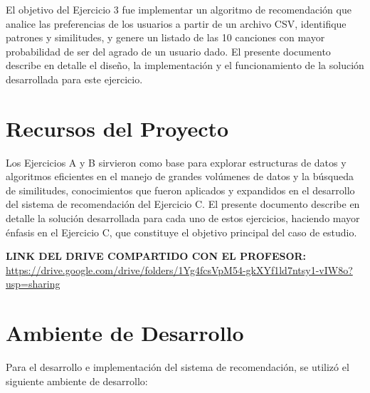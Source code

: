 \documentclass{article}
\begin{document}
El objetivo del Ejercicio 3 fue implementar un algoritmo de recomendación que analice las preferencias de los usuarios a partir de un archivo CSV, identifique patrones y similitudes, y genere un listado de las 10 canciones con mayor probabilidad de ser del agrado de un usuario dado. El presente documento describe en detalle el diseño, la implementación y el funcionamiento de la solución desarrollada para este ejercicio.

\section{Recursos del Proyecto}

Los Ejercicios A y B sirvieron como base para explorar estructuras de datos y algoritmos eficientes en el manejo de grandes volúmenes de datos y la búsqueda de similitudes, conocimientos que fueron aplicados y expandidos en el desarrollo del sistema de recomendación del Ejercicio C. El presente documento describe en detalle la solución desarrollada para cada uno de estos ejercicios, haciendo mayor énfasis en el Ejercicio C, que constituye el objetivo principal del caso de estudio.


\vspace{0.5em} %
\noindent \textbf{LINK DEL DRIVE COMPARTIDO CON EL PROFESOR:} \\
\href{https://drive.google.com/drive/folders/1Yg4fcsVpM54-gkXYf1ld7ntsy1-vIW8o?usp=sharing}{https://drive.google.com/drive/folders/1Yg4fcsVpM54-gkXYf1ld7ntsy1-vIW8o?usp=sharing}

\section{Ambiente de Desarrollo}

Para el desarrollo e implementación del sistema de recomendación, se utilizó el siguiente ambiente de desarrollo:
\end{document}
